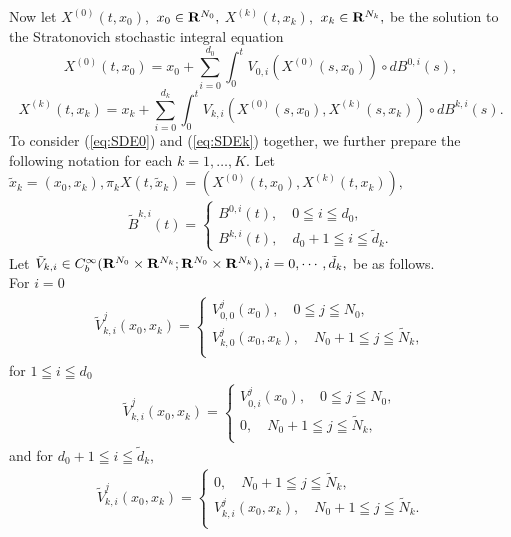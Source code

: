 \documentclass[12pt]{article}
\begin{document}
\noindent Now let ${X}^{(0)}(t,{x}_0),$  ${x}_0\in {\bf R}^{{N}_0},$ 
${X}^{(k)}(t,{x}_k),$  ${x}_k\in {\bf R}^{{N}_k},$ 
be the solution to the Stratonovich stochastic integral equation 
\begin{equation}
{X}^{(0)}(t,x_0) = {x}_0 + \sum_{i=0}^{d_0} \int_{0}^{t} V_{0, i}({X}^{(0)}(s,{x}_0))\circ dB^{0, i}(s),
\label{eq:SDE0}
\end{equation}
\begin{equation}
{X}^{(k)}(t,x_k) = {x}_k + \sum_{i=0}^{d_k} \int_{0}^{t} V_{k, i}({X}^{(0)}(s,{x}_0), {X}^{(k)}(s,{x}_k))\circ dB^{k, i}(s).
\label{eq:SDEk}
\end{equation}
 To consider (\ref{eq:SDE0}) and (\ref{eq:SDEk}) together, we further prepare the following notation for each $k= 1,\ldots, K$.
 Let $\tilde{x}_k=(x_0, x_k), \pi_k{X}(t,\tilde{x}_k)=(X^{(0)}(t, x_0),X^{(k)}(t, x_k)), $
 \begin{align*}
 \tilde{B}^{k,i}(t)= 
 \begin{cases}
 B^{0,i}(t), \quad  0 \leqq i \leqq d_0, \\
 B^{k,i}(t), \quad d_0+1 \leqq i \leqq \tilde{d}_k.
 \end{cases}
 \end{align*}
 Let $\tilde{V}_{k, i} \in C^{\infty}_b({\bf R}^{{N}_0}\times {\bf R}^{{N}_k};{\bf R}^{{N}_0}\times{\bf R}^{{N}_k}), i =0, \cdots, \tilde{d}_k,$ be as follows.\\
 For $i=0$
 \begin{align*}
 \tilde{V}^j_{k,i}(x_0, x_k)= 
 \begin{cases}
  V^j_{0,0}(x_0), \quad  0 \leqq j \leqq N_0, \\
 V^j_{k,0}(x_0, x_k), \quad N_0+1 \leqq j \leqq \tilde{N}_k,\\
\end{cases}
 \end{align*}
for $ 1\leqq i \leqq d_0$
 \begin{align*}
 \tilde{V}^j_{k,i}(x_0, x_k)= 
 \begin{cases}
 V^j_{0,i}(x_0), \quad  0 \leqq j \leqq N_0, \\
 0, \quad  N_0+1 \leqq j \leqq \tilde{N}_k, \\
 \end{cases}
 \end{align*}
and for $ d_0+1 \leqq i \leqq \tilde{d}_k,$
  \begin{align*}
 \tilde{V}^j_{k,i}(x_0, x_k)= 
 \begin{cases}
0, \quad  N_0+1 \leqq j \leqq \tilde{N}_k, \\
 V^j_{k,i}(x_0, x_k), \quad N_0+1 \leqq j \leqq \tilde{N}_k.\\
 \end{cases}
 \end{align*}
\end{document}
